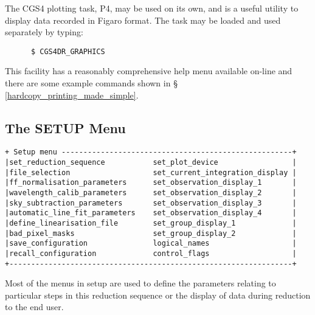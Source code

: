 {The CGS4 plotting task, P4, may be used on its own, and is a useful utility
to display data recorded in Figaro format. The task may be loaded and used 
separately by typing:

\begin{verbatim}
      $ CGS4DR_GRAPHICS
\end{verbatim}

This facility has a reasonably comprehensive help menu available on-line
and there are some example commands shown in \S 
\ref{hardcopy_printing_made_simple}.

\subsection{The SETUP Menu}
\label{the_setup_menu}
\begin{verbatim}
+ Setup menu -----------------------------------------------------+
|set_reduction_sequence           set_plot_device                 |
|file_selection                   set_current_integration_display |
|ff_normalisation_parameters      set_observation_display_1       |
|wavelength_calib_parameters      set_observation_display_2       |
|sky_subtraction_parameters       set_observation_display_3       |
|automatic_line_fit_parameters    set_observation_display_4       |
|define_linearisation_file        set_group_display_1             |
|bad_pixel_masks                  set_group_display_2             |
|save_configuration               logical_names                   |
|recall_configuration             control_flags                   |
+-----------------------------------------------------------------+
\end{verbatim}

Most of the menus in {\sf setup} are used to define the
parameters relating to particular steps in this reduction sequence
or the display of data during reduction to the end user.

}
